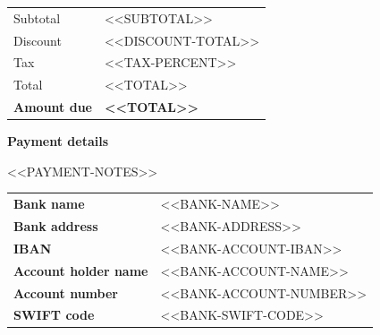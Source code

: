 \documentclass[letterpaper]{article}
\begin{document}
\vspace{10pt}

\hfill
\begin{tabularx}{0.5\textwidth}{l >{\raggedleft\arraybackslash}X}
    Subtotal                    & <<SUBTOTAL>>              \\
    \arrayrulecolor{offwhite}\hline
    Discount                    & <<DISCOUNT-TOTAL>>        \\
    \hline
    Tax                         & <<TAX-PERCENT>>           \\
    \hline
    Total                       & <<TOTAL>>                 \\
    \hline
    \large\textbf{Amount due}   & \large\textbf{<<TOTAL>>}
\end{tabularx}

\vspace{2em}
\vfill

\LARGE\textbf{Payment details}\vspace{0.2em}

\normalsize{<<PAYMENT-NOTES>>}

\begin{tabular}{@{}l l}
\textbf{Bank name}              & <<BANK-NAME>> \\
\textbf{Bank address}           & <<BANK-ADDRESS>> \\
\textbf{IBAN}                   & <<BANK-ACCOUNT-IBAN>> \\ %
\textbf{Account holder name}    & <<BANK-ACCOUNT-NAME>> \\
\textbf{Account number}         & <<BANK-ACCOUNT-NUMBER>> \\
\textbf{SWIFT code}             & <<BANK-SWIFT-CODE>>
\end{tabular}

\vspace{10pt}
\end{document}
